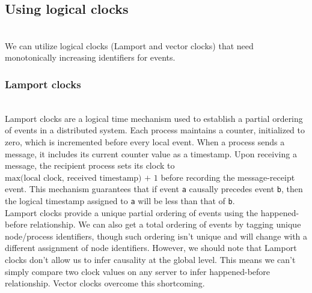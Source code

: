 \begin{table}[htbp]
\centering
\small
{}
\caption{Requirements Fulfilled by Each Approach}
\end{table}

\subsection{Using logical clocks}\label{pzoCD1h8qFHujgeCThCn0}
\\
We can utilize logical clocks (Lamport and vector clocks) that need monotonically increasing identifiers for events.

\subsubsection{Lamport clocks}\label{8CiRv1fmewL4y2Qed65n8}
\\
Lamport clocks are a logical time mechanism used to establish a partial ordering of events in a distributed system. Each process maintains a counter, initialized to zero, which is incremented before every local event. When a process sends a message, it includes its current counter value as a timestamp. Upon receiving a message, the recipient process sets its clock to \protect{}\label{katex_inline_9LlELwexNdU3UkX21IWZ8}{{{\(\text{max(local clock, received timestamp) + 1}\)}}} before recording the message-receipt event. This mechanism guarantees that if event \texttt{a} causally precedes event \texttt{b}, then the logical timestamp assigned to \texttt{a} will be less than that of \texttt{b}.
\\
Lamport clocks provide a unique partial ordering of events using the happened-before relationship. We can also get a total ordering of events by tagging unique node/process identifiers, though such ordering isn't unique and will change with a different assignment of node identifiers. However, we should note that Lamport clocks don't allow us to infer causality at the global level. This means we can't simply compare two clock values on any server to infer happened-before relationship. Vector clocks overcome this shortcoming.

